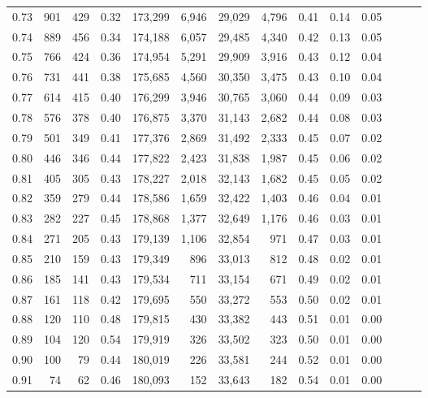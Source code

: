 \begin{tabular}{rrrrrrrrrrrrrr}
0.73 &    901 &    429 &  0.32 &  173,299 &    6,946 &  29,029 &   4,796 &  0.41 &  0.14 &      0.05 \\
0.74 &    889 &    456 &  0.34 &  174,188 &    6,057 &  29,485 &   4,340 &  0.42 &  0.13 &      0.05 \\
0.75 &    766 &    424 &  0.36 &  174,954 &    5,291 &  29,909 &   3,916 &  0.43 &  0.12 &      0.04 \\
0.76 &    731 &    441 &  0.38 &  175,685 &    4,560 &  30,350 &   3,475 &  0.43 &  0.10 &      0.04 \\
0.77 &    614 &    415 &  0.40 &  176,299 &    3,946 &  30,765 &   3,060 &  0.44 &  0.09 &      0.03 \\
0.78 &    576 &    378 &  0.40 &  176,875 &    3,370 &  31,143 &   2,682 &  0.44 &  0.08 &      0.03 \\
0.79 &    501 &    349 &  0.41 &  177,376 &    2,869 &  31,492 &   2,333 &  0.45 &  0.07 &      0.02 \\
0.80 &    446 &    346 &  0.44 &  177,822 &    2,423 &  31,838 &   1,987 &  0.45 &  0.06 &      0.02 \\
0.81 &    405 &    305 &  0.43 &  178,227 &    2,018 &  32,143 &   1,682 &  0.45 &  0.05 &      0.02 \\
0.82 &    359 &    279 &  0.44 &  178,586 &    1,659 &  32,422 &   1,403 &  0.46 &  0.04 &      0.01 \\
0.83 &    282 &    227 &  0.45 &  178,868 &    1,377 &  32,649 &   1,176 &  0.46 &  0.03 &      0.01 \\
0.84 &    271 &    205 &  0.43 &  179,139 &    1,106 &  32,854 &     971 &  0.47 &  0.03 &      0.01 \\
0.85 &    210 &    159 &  0.43 &  179,349 &      896 &  33,013 &     812 &  0.48 &  0.02 &      0.01 \\
0.86 &    185 &    141 &  0.43 &  179,534 &      711 &  33,154 &     671 &  0.49 &  0.02 &      0.01 \\
0.87 &    161 &    118 &  0.42 &  179,695 &      550 &  33,272 &     553 &  0.50 &  0.02 &      0.01 \\
0.88 &    120 &    110 &  0.48 &  179,815 &      430 &  33,382 &     443 &  0.51 &  0.01 &      0.00 \\
0.89 &    104 &    120 &  0.54 &  179,919 &      326 &  33,502 &     323 &  0.50 &  0.01 &      0.00 \\
0.90 &    100 &     79 &  0.44 &  180,019 &      226 &  33,581 &     244 &  0.52 &  0.01 &      0.00 \\
0.91 &     74 &     62 &  0.46 &  180,093 &      152 &  33,643 &     182 &  0.54 &  0.01 &      0.00 \\

\end{tabular}
